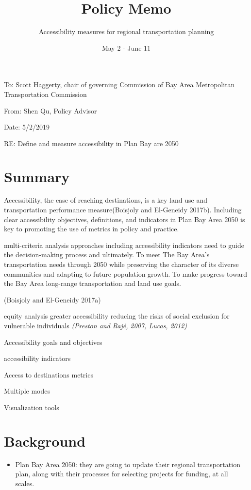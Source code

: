 \documentclass[12pt,]{article}
\title{Policy Memo}
\subtitle{Accessibility measures for regional transportation planning}
\author{}
\date{May 2 - June 11}
\providecommand{\tightlist}{%
  \setlength{\itemsep}{0pt}\setlength{\parskip}{0pt}}
\begin{document}
\maketitle

To: Scott Haggerty, chair of governing Commission of Bay Area
Metropolitan Transportation Commission

From: Shen Qu, Policy Advisor

Date: 5/2/2019

RE: Define and measure accessibility in Plan Bay are 2050

\hypertarget{summary}{%
\section{Summary}\label{summary}}

Accessibility, the ease of reaching destinations, is a key land use and
transportation performance measure(Boisjoly and El-Geneidy 2017b).
Including clear accessibility objectives, definitions, and indicators in
Plan Bay Area 2050 is key to promoting the use of metrics in policy and
practice.

multi-criteria analysis approaches including accessibility indicators
need to guide the decision-making process and ultimately. To meet The
Bay Area's transportation needs through 2050 while preserving the
character of its diverse communities and adapting to future population
growth. To make progress toward the Bay Area long-range transportation
and land use goals.

(Boisjoly and El-Geneidy 2017a)

equity analysis greater accessibility reducing the risks of social
exclusion for vulnerable individuals \emph{(Preston and Rajé, 2007,
Lucas, 2012)}

Accessibility goals and objectives

accessibility indicators

Access to destinations metrics

Multiple modes

Visualization tools

\hypertarget{background}{%
\section{Background}\label{background}}

\begin{itemize}
\tightlist
\item
  Plan Bay Area 2050: they are going to update their regional
  transportation plan, along with their processes for selecting projects
  for funding, at all scales.
\end{itemize}
\end{document}
